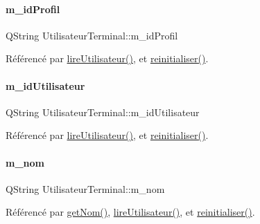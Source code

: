\paragraph{\texorpdfstring{m\+\_\+id\+Profil}{m\_idProfil}}
{\footnotesize\ttfamily Q\+String Utilisateur\+Terminal\+::m\+\_\+id\+Profil\hspace{0.3cm}{\ttfamily [private]}}



Référencé par \hyperlink{class_utilisateur_terminal_a196420ecc14bc0645e3e1c66d796b8e6}{lire\+Utilisateur()}, et \hyperlink{class_utilisateur_terminal_a63b37fa7cbf08976e5a09cbfbdb55f42}{reinitialiser()}.

\mbox{\label{class_utilisateur_terminal_a3a8aeb429529ae1600c799e427370f78}} 
\paragraph{\texorpdfstring{m\+\_\+id\+Utilisateur}{m\_idUtilisateur}}
{\footnotesize\ttfamily Q\+String Utilisateur\+Terminal\+::m\+\_\+id\+Utilisateur\hspace{0.3cm}{\ttfamily [private]}}



Référencé par \hyperlink{class_utilisateur_terminal_a196420ecc14bc0645e3e1c66d796b8e6}{lire\+Utilisateur()}, et \hyperlink{class_utilisateur_terminal_a63b37fa7cbf08976e5a09cbfbdb55f42}{reinitialiser()}.

\mbox{\label{class_utilisateur_terminal_a4b48835dcadacd5e7d5c9662b70cdc7d}} 
\paragraph{\texorpdfstring{m\+\_\+nom}{m\_nom}}
{\footnotesize\ttfamily Q\+String Utilisateur\+Terminal\+::m\+\_\+nom\hspace{0.3cm}{\ttfamily [private]}}



Référencé par \hyperlink{class_utilisateur_terminal_a6432e5c3b9a732ef9312f67718648bf1}{get\+Nom()}, \hyperlink{class_utilisateur_terminal_a196420ecc14bc0645e3e1c66d796b8e6}{lire\+Utilisateur()}, et \hyperlink{class_utilisateur_terminal_a63b37fa7cbf08976e5a09cbfbdb55f42}{reinitialiser()}.


